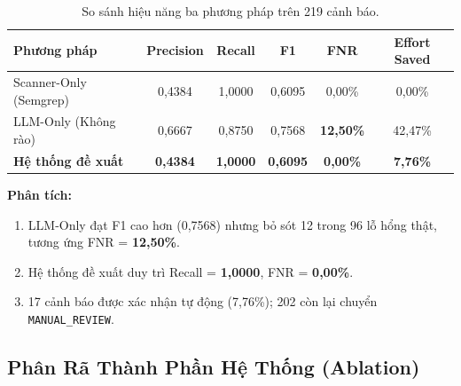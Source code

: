 \documentclass[12pt, a4paper]{article}
\begin{document}
\begin{table}[H]
  \centering
  \caption{So sánh hiệu năng ba phương pháp trên 219 cảnh báo.}
  \label{tab:baseline}
  \small
  \begin{tabular}{lccccc}
    \toprule
    \textbf{Phương pháp} & \textbf{Precision} & \textbf{Recall}
      & \textbf{F1} & \textbf{FNR} & \textbf{Effort Saved} \\
    \midrule
    Scanner-Only (Semgrep)     & 0,4384 & 1,0000 & 0,6095
      & 0,00\%  & 0,00\% \\
    LLM-Only (Không rào)       & 0,6667 & 0,8750 & 0,7568
      & \textcolor{accentred}{\textbf{12,50\%}}  & 42,47\% \\
    \textbf{Hệ thống đề xuất}  & \textbf{0,4384} & \textbf{1,0000}
      & \textbf{0,6095}
      & \textcolor{accentgreen}{\textbf{0,00\%}} & \textbf{7,76\%} \\
    \bottomrule
  \end{tabular}
\end{table}

\noindent\textbf{Phân tích:}
\begin{enumerate}
  \item LLM-Only đạt F1 cao hơn (0,7568) nhưng bỏ sót 12 trong 96
        lỗ hổng thật, tương ứng FNR = \textbf{12,50\%}.
  \item Hệ thống đề xuất duy trì Recall = \textbf{1,0000},
        FNR = \textbf{0,00\%}.
  \item 17 cảnh báo được xác nhận tự động (7,76\%); 202 còn lại chuyển
        \texttt{MANUAL\_REVIEW}.
\end{enumerate}

\subsection{Phân Rã Thành Phần Hệ Thống (Ablation)}
\end{document}
